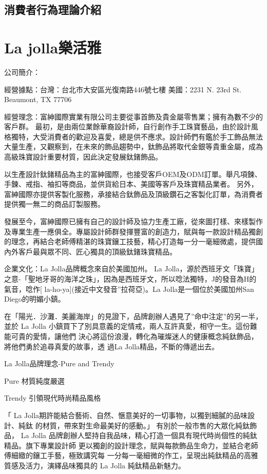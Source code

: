 \subsection{消費者行為理論介紹}

\section{La jolla樂活雅}

公司簡介：

經營據點：台灣：台北市大安區光復南路446號七樓 
               美國：2231 N. 23rd St. Beaumont, TX 77706

 經營理念：富紳國際實業有限公司主要從事首飾及貴金屬零售業；擁有為數不少的客戶群。
最初，是由兩位業餘華裔設計師，自行創作手工珠寶藝品，由於設計風格獨特，大受消費者的歡迎及喜愛，總是供不應求。設計師們有鑑於手工飾品無法大量生產，又觀察到，在未來的飾品趨勢中，鈦飾品將取代金銀等貴重金屬，成為高級珠寶設計重要材質，因此決定發展鈦鍺飾品。

以生產設計鈦鍺精品為主的富紳國際，也接受客戶OEM及ODM訂單。舉凡項鍊、手鍊、戒指、袖扣等商品，並供貨給日本、美國等客戶及珠寶精品業者。
另外，富紳國際亦提供客製化服務，承接結合鈦飾品及頂級鑽石之客製化訂單，為消費者
提供獨一無二的商品訂製服務。

發展至今，富紳國際已擁有自己的設計師及協力生產工廠，從來圖打樣、來樣製作及專業生產一應俱全。專屬設計師群發揮豐富的創造力，賦與每一款設計精品獨創的理念，再結合老師傅精湛的珠寶鑲工技藝，精心打造每一分一毫細微處，提供國內外客戶最與眾不同、匠心獨具的頂級鈦鍺珠寶精品。

 企業文化：La Jolla品牌概念來自於美國加州。 La Jolla，源於西班牙文「珠寶」之意-「聖地牙哥的海洋之珠」，因為是西班牙文，所以唸法獨特，J的發音為H的氣音，唸作[ la-ho-ya](接近中文發音”拉荷亞)。La Jolla是一個位於美國加州San Diego的明媚小鎮。

在「陽光．沙灘．美麗海岸」的見證下，品牌創辦人遇見了”命中注定”的另一半，並於 La Jolla
小鎮買下了別具意義的定情戒，兩人互許真愛，相守一生。這份難能可貴的愛情，讓他們
決心將這份浪漫，轉化為璀燦迷人的健康概念純鈦飾品，將他們勇於追尋真愛的故事，透
過La Jolla精品，不斷的傳遞出去。

La Jolla品牌理念-Pure and  Trendy

Pure 材質純度嚴選 

Trendy 引領現代時尚精品風格 

「 La Jolla期許能結合藝術、自然、愜意美好的一切事物，以獨到細膩的品味設計、純鈦
的材質，帶來對生命最美好的感動。」 有別於一般市售的大眾化純鈦飾品， La Jolla
品牌創辦人堅持自我品味，精心打造一個具有現代時尚個性的純鈦精品。旗下專業設計師
更以獨創的設計理念，賦與每款飾品生命力，並結合老師傅細緻的鑲工手藝，極致講究每
一分每一毫細微的作工，呈現出純鈦精品的高雅質感及活力，演繹品味獨具的 La Jolla
純鈦精品新魅力。
 
